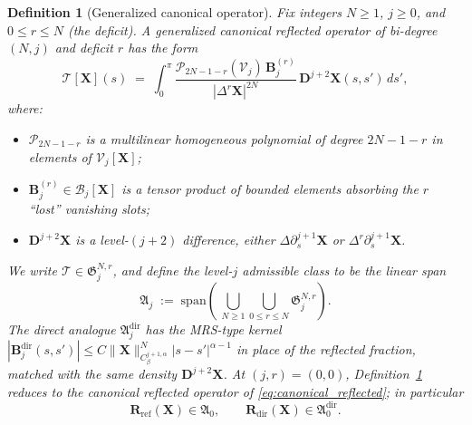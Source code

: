 \documentclass{amsart}
\newtheorem{definition}[theorem]{Definition}
\begin{document}
\begin{definition}[Generalized canonical operator]
\label{def:generalized_canonical}
Fix integers $N \ge 1$, $j \ge 0$, and $0 \le r \le N$ (the \emph{deficit}).  A \emph{generalized canonical reflected operator of bi-degree $(N, j)$ and deficit $r$} has the form
\[
\mathcal{T}[\mathbf{X}](s) \;=\; \int_0^\pi
\frac{\mathcal{P}_{2N-1-r}(\mathcal{V}_j)\,\mathbf{B}_j^{(r)}}{|\Delta^r\mathbf{X}|^{2N}}\,
\mathbf{D}^{j+2}\mathbf{X}(s,s')\, ds',
\]
where:
\begin{itemize}
\item $\mathcal{P}_{2N-1-r}$ is a multilinear homogeneous polynomial of degree $2N-1-r$ in elements of $\mathcal{V}_j[\mathbf{X}]$;
\item $\mathbf{B}_j^{(r)} \in \mathcal{B}_j[\mathbf{X}]$ is a tensor product of bounded elements absorbing the $r$ ``lost'' vanishing slots;
\item $\mathbf{D}^{j+2}\mathbf{X}$ is a level-$(j+2)$ difference, either $\Delta\partial_s^{j+1}\mathbf{X}$ or $\Delta^r\partial_s^{j+1}\mathbf{X}$.
\end{itemize}
We write $\mathcal{T} \in \mathfrak{G}_j^{N,r}$, and define the \emph{level-$j$ admissible class} to be the linear span
\[
\mathfrak{A}_j \;:=\; \mathrm{span}\!\left(\,\bigcup_{N \ge 1}\bigcup_{0 \le r \le N} \mathfrak{G}_j^{N,r}\right).
\]
The \emph{direct analogue} $\mathfrak{A}_j^{\mathrm{dir}}$ has the MRS-type \cite{mori2019well} kernel $|\mathbf{B}_j^{\mathrm{dir}}(s,s')| \le C\|\mathbf{X}\|_{C^{j+1,\alpha}_\beta}^N |s-s'|^{\alpha-1}$ in place of the reflected fraction, matched with the same density $\mathbf{D}^{j+2}\mathbf{X}$.  At $(j, r) = (0, 0)$, Definition~\ref{def:generalized_canonical} reduces to the canonical reflected operator of \eqref{eq:canonical_reflected}; in particular
\[
\mathbf{R}_{\mathrm{ref}}(\mathbf{X}) \in \mathfrak{A}_0,
\qquad
\mathbf{R}_{\mathrm{dir}}(\mathbf{X}) \in \mathfrak{A}_0^{\mathrm{dir}}.
\]
\end{definition}
\end{document}
